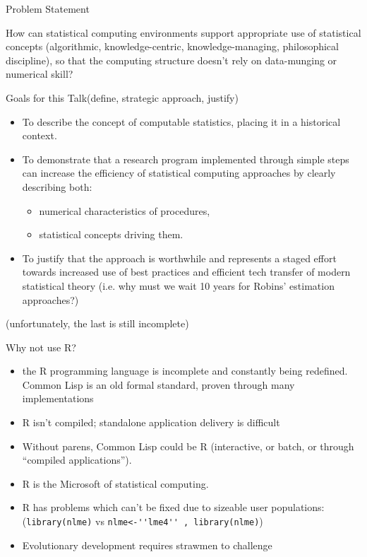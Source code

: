 \documentclass{beamer}
\begin{document}
\begin{frame}{Problem Statement}

  How can statistical computing environments support appropriate use
  of statistical concepts (algorithmic, knowledge-centric,
  knowledge-managing, philosophical discipline), so that the computing
  structure doesn't rely on data-munging or numerical skill?

\end{frame}


\begin{frame}{Goals for this Talk}{(define, strategic approach,
    justify)}

  \begin{itemize}
  \item To describe the concept of \alert{computable statistics},
    placing it in a historical context.

  \item To demonstrate that \alert{a research program}
    implemented through  simple steps can increase the efficiency  of
    statistical computing approaches by  clearly describing both:
    \begin{itemize}
    \item numerical characteristics of procedures,
    \item statistical concepts driving them.
    \end{itemize}

  \item To justify that the \alert{approach is worthwhile} and
    represents a staged effort towards \alert{increased use of best
      practices} and efficient tech transfer of modern statistical
    theory (i.e. why must we wait 10 years for Robins' estimation
    approaches?)
  \end{itemize}
  (unfortunately, the last is still incomplete)
\end{frame}

\begin{frame}[fragile]{Why not use R?}
  \begin{itemize}
  \item the R programming language is incomplete and constantly being
    redefined.  Common Lisp is an old formal standard, proven through
    many implementations
  \item R isn't compiled; standalone application delivery is difficult
  \item Without parens, Common Lisp could be R (interactive, or batch,
    or through ``compiled applications'').
  \item R is the Microsoft of statistical computing.
  \item R has problems which can't be fixed due to sizeable user
    populations:
    (\verb+library(nlme)+ vs \verb+nlme<-''lme4'' , library(nlme)+)
  \item Evolutionary development requires strawmen to challenge
\end{itemize}

\end{frame}
\end{document}
